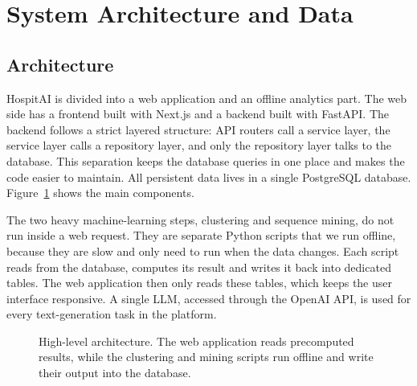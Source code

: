 
\section{System Architecture and Data}
\label{sec:system}

\subsection{Architecture}

HospitAI is divided into a web application and an offline analytics part. The web side has a frontend built with Next.js and a backend built with FastAPI. The backend follows a strict layered structure: API routers call a service layer, the service layer calls a repository layer, and only the repository layer talks to the database. This separation keeps the database queries in one place and makes the code easier to maintain. All persistent data lives in a single PostgreSQL database. Figure~\ref{fig:arch} shows the main components.

The two heavy machine-learning steps, clustering and sequence mining, do not run inside a web request. They are separate Python scripts that we run offline, because they are slow and only need to run when the data changes. Each script reads from the database, computes its result and writes it back into dedicated tables. The web application then only reads these tables, which keeps the user interface responsive. A single LLM, accessed through the OpenAI API, is used for every text-generation task in the platform.

\begin{figure}[t]
\centering
{}
\caption{High-level architecture. The web application reads precomputed results, while the clustering and mining scripts run offline and write their output into the database.}
\label{fig:arch}
\end{figure}

